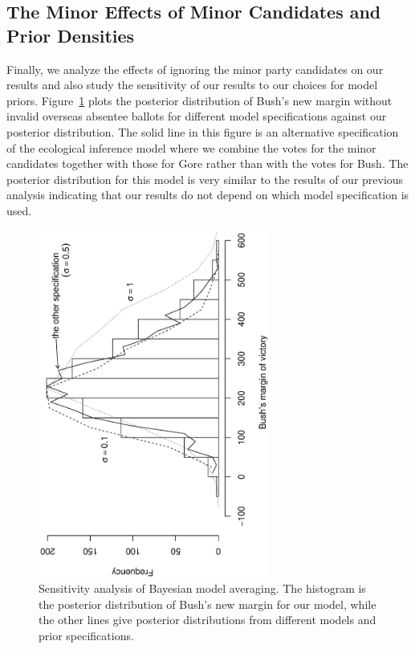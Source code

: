 \documentclass[11pt,titlepage]{article}
\begin{document}
\subsection{The Minor Effects of Minor Candidates and Prior Densities}

Finally, we analyze the effects of ignoring the minor party candidates
on our results and also study the sensitivity of our results to our
choices for model priors.  Figure~\ref{fg:sensitivity} plots the
posterior distribution of Bush's new margin without invalid overseas
absentee ballots for different model specifications against our
posterior distribution.  The solid line in this figure is an
alternative specification of the ecological inference model where we
combine the votes for the minor candidates together with those for
Gore rather than with the votes for Bush. The posterior distribution
for this model is very similar to the results of our previous analysis
indicating that our results do not depend on which model specification
is used.
\begin{figure}[t]
\begin{center}
\includegraphics[width=3in,height=4.5in,angle=-90]{sensitivity}
\caption{Sensitivity analysis of Bayesian model
  averaging. The histogram is the posterior distribution of Bush's new
  margin for our model, while the other lines give posterior
  distributions from different models and prior specifications.}
\label{fg:sensitivity}
\end{center} 
\end{figure}
\end{document}
